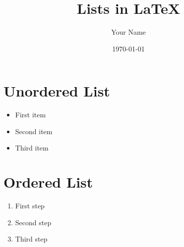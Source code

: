\documentclass{article}
\title{Lists in LaTeX}
\author{Your Name}
\date{\today}
\begin{document}
\maketitle

\section{Unordered List}

\begin{itemize}
    \item First item
    \item Second item
    \item Third item
\end{itemize}

\section{Ordered List}

\begin{enumerate}
    \item First step
    \item Second step
    \item Third step
\end{enumerate}
\end{document}

